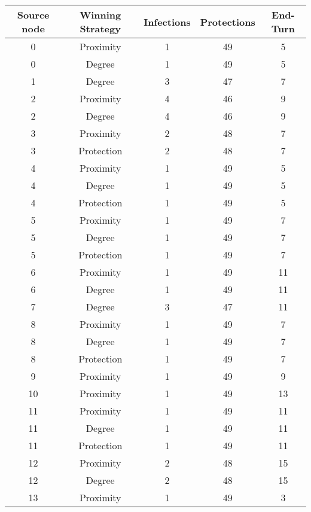 \documentclass[results.tex]{subfiles}
\begin{document}
\begin{center}
  \begin{tabular}{| c || c | c | c | c |}
    \hline
    {\bfseries Source node} & {\bfseries Winning Strategy} & {\bfseries Infections} & {\bfseries Protections} & {\bfseries End-Turn} \\  %
    \hline\hline
    0 & Proximity & 1 & 49 & 5 \\ 
    \hline
    0 & Degree & 1 & 49 & 5 \\ 
    \hline
    1 & Degree & 3 & 47 & 7 \\ 
    \hline
    2 & Proximity & 4 & 46 & 9 \\ 
    \hline
    2 & Degree & 4 & 46 & 9 \\ 
    \hline
    3 & Proximity & 2 & 48 & 7 \\ 
    \hline
    3 & Protection & 2 & 48 & 7 \\ 
    \hline
    4 & Proximity & 1 & 49 & 5 \\ 
    \hline
    4 & Degree & 1 & 49 & 5 \\ 
    \hline
    4 & Protection & 1 & 49 & 5 \\ 
    \hline
    5 & Proximity & 1 & 49 & 7 \\ 
    \hline
    5 & Degree & 1 & 49 & 7 \\ 
    \hline
    5 & Protection & 1 & 49 & 7 \\ 
    \hline
    6 & Proximity & 1 & 49 & 11 \\ 
    \hline
    6 & Degree & 1 & 49 & 11 \\ 
    \hline
    7 & Degree & 3 & 47 & 11 \\ 
    \hline
    8 & Proximity & 1 & 49 & 7 \\ 
    \hline
    8 & Degree & 1 & 49 & 7 \\ 
    \hline
    8 & Protection & 1 & 49 & 7 \\ 
    \hline
    9 & Proximity & 1 & 49 & 9 \\ 
    \hline
    10 & Proximity & 1 & 49 & 13 \\ 
    \hline
    11 & Proximity & 1 & 49 & 11 \\ 
    \hline
    11 & Degree & 1 & 49 & 11 \\ 
    \hline
    11 & Protection & 1 & 49 & 11 \\ 
    \hline
    12 & Proximity & 2 & 48 & 15 \\ 
    \hline
    12 & Degree & 2 & 48 & 15 \\ 
    \hline
    13 & Proximity & 1 & 49 & 3 \\ 

\end{tabular}
\end{center}
\end{document}

